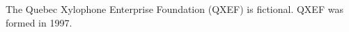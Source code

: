 \documentclass{grattan}
\begin{document}
The Quebec Xylophone Enterprise Foundation (QXEF) is fictional.
QXEF was formed in 1997.
\end{document}
